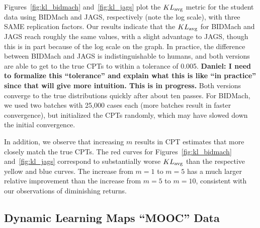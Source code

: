\documentclass{article} %
\begin{document}
Figures~\ref{fig:kl_bidmach} and~\ref{fig:kl_jags} plot the $KL_{\rm avg}$ metric for the student
data using BIDMach and JAGS, respectively (note the log scale), with three SAME replication factors.
Our results indicate that the $KL_{\rm avg}$ for BIDMach and JAGS reach roughly the same values,
with a slight advantage to JAGS, though this is in part because of the log scale on the graph. In
practice, the difference between BIDMach and JAGS is indistinguishable to humans, and both versions
are able to get to the true CPTs to within a tolerance of 0.005.  \textbf{Daniel: I need to
formalize this ``tolerance'' and explain what this is like ``in practice'' since that will give more
intuition.  This is in progress.} Both versions converge to the true distributions quickly after
about ten passes. For BIDMach, we used two batches with 25,000 cases each (more batches result in
faster convergence), but initialized the CPTs randomly, which may have slowed down the initial
convergence.

In addition, we observe that increasing $m$ results in CPT estimates that more closely match the
true CPTs. The red curves for Figures~\ref{fig:kl_bidmach} and~\ref{fig:kl_jags} correspond to
substantially worse $KL_{\rm avg}$ than the respective yellow and blue curves. The increase from
$m=1$ to $m=5$ has a much larger relative improvement than the increase from $m=5$ to $m=10$,
consistent with our observations of diminishing returns.


\subsection{Dynamic Learning Maps ``MOOC'' Data}\label{ssec:mooc_data}
\end{document}
